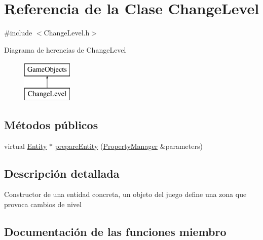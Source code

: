\hypertarget{classChangeLevel}{}\section{Referencia de la Clase Change\+Level}
\label{classChangeLevel}


{\ttfamily \#include $<$Change\+Level.\+h$>$}

Diagrama de herencias de Change\+Level\begin{figure}[H]
\begin{center}
\leavevmode
\includegraphics[height=2.000000cm]{classChangeLevel}
\end{center}
\end{figure}
\subsection*{Métodos públicos}
\begin{DoxyCompactItemize}
\item 
virtual \hyperlink{classEntity}{Entity} $\ast$ \hyperlink{classChangeLevel_aca170d1bbcbedf884246e48d9719fa89}{prepare\+Entity} (\hyperlink{classPropertyManager}{Property\+Manager} \&parameters)
\end{DoxyCompactItemize}


\subsection{Descripción detallada}
Constructor de una entidad concreta, un objeto del juego define una zona que provoca cambios de nivel 

\subsection{Documentación de las funciones miembro}
\hypertarget{classChangeLevel_aca170d1bbcbedf884246e48d9719fa89}{}
